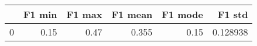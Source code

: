\begin{tabular}{lrrrrr}
\toprule
{} &  F1 min &  F1 max &  F1 mean &  F1 mode &    F1 std \\
\midrule
0 &    0.15 &    0.47 &    0.355 &     0.15 &  0.128938 \\
\bottomrule
\end{tabular}
